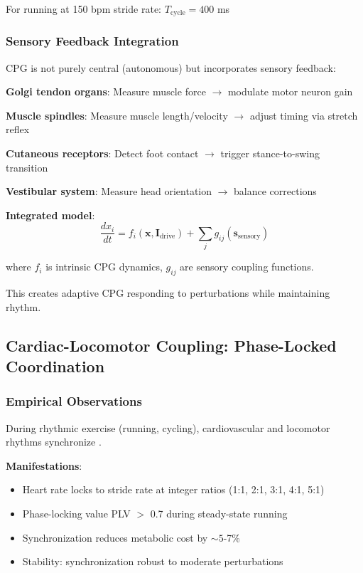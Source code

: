 \documentclass[11pt,onecolumn]{article}
\begin{document}
For running at 150 bpm stride rate: $T_{\text{cycle}} = 400$ ms

\subsubsection{Sensory Feedback Integration}

CPG is not purely central (autonomous) but incorporates sensory feedback:

\textbf{Golgi tendon organs}: Measure muscle force $\to$ modulate motor neuron gain

\textbf{Muscle spindles}: Measure muscle length/velocity $\to$ adjust timing via stretch reflex

\textbf{Cutaneous receptors}: Detect foot contact $\to$ trigger stance-to-swing transition

\textbf{Vestibular system}: Measure head orientation $\to$ balance corrections

\textbf{Integrated model}:
\begin{equation}
\frac{dx_i}{dt} = f_i(\mathbf{x}, \mathbf{I}_{\text{drive}}) + \sum_j g_{ij}(\mathbf{s}_{\text{sensory}})
\end{equation}

where $f_i$ is intrinsic CPG dynamics, $g_{ij}$ are sensory coupling functions.

This creates adaptive CPG responding to perturbations while maintaining rhythm.

\subsection{Cardiac-Locomotor Coupling: Phase-Locked Coordination}

\subsubsection{Empirical Observations}

During rhythmic exercise (running, cycling), cardiovascular and locomotor rhythms synchronize \citep{niizeki1993intramuscular}.

\textbf{Manifestations}:
\begin{itemize}
\item Heart rate locks to stride rate at integer ratios (1:1, 2:1, 3:1, 4:1, 5:1)
\item Phase-locking value PLV $>$ 0.7 during steady-state running
\item Synchronization reduces metabolic cost by $\sim 5$-7\%
\item Stability: synchronization robust to moderate perturbations
\end{itemize}
\end{document}
